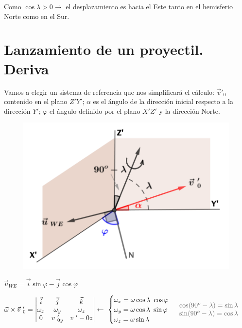 Como $\cos \lambda > 0 \to $ el desplazamiento es hacia el Este tanto en el hemisferio Norte como en el Sur. 

\section{Lanzamiento de un proyectil. Deriva}

Vamos a elegir un sistema de referencia que nos simplificará el cálculo: $\vec v'_0$ contenido en el plano $Z'Y'$; $\alpha$ es el ángulo de la dirección inicial respecto a la dirección $Y'$; $\varphi$ el ángulo definido por el plano $X'Z'$ y la dirección Norte.

\begin{figure}[H]
	\centering
	\includegraphics[width=.8\textwidth]{imagenes/imagenes11/T11IM10.png}
\end{figure}

$\vec u_{WE}=\vec i \sin \varphi -\vec j \cos \varphi$

$\vec \omega \times \vec v\ _0'=
\left|\begin{matrix} 
\vec i&\vec j&\vec k \\ \omega_x&\omega_y&\omega_z \\ 0&v\ '_{0y}&v\ '-{0z}
\end{matrix}\right| \leftarrow \
\begin{cases}
\omega_x=\omega \cos \lambda \ \cos \varphi \\
\omega_y=\omega \cos \lambda \ \sin \varphi \\	
\omega_z=\omega \sin \lambda
\end{cases}
\ \textcolor{gris}{\begin{matrix}\cos (90^o-\lambda)=\sin \lambda \\ \sin (90^o-\lambda)=\cos \lambda \end{matrix}}$

